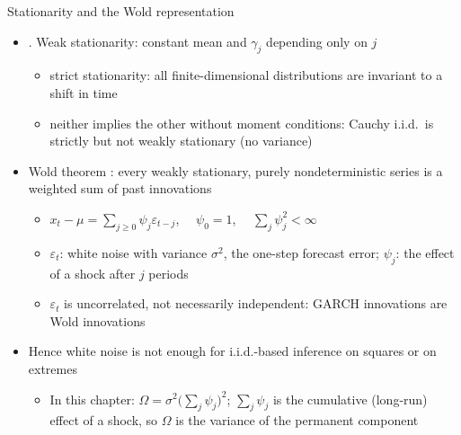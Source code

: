 \begin{frame}{Stationarity and the Wold representation}
\itemsize{\small}
\begin{itemize}
    \item {}. Weak stationarity: constant mean and $\gamma_j$ depending only on $j$
    \begin{itemize}
        \item strict stationarity: all finite-dimensional distributions are invariant to a shift in time
        \item neither implies the other without moment conditions: Cauchy i.i.d.\ is strictly but not weakly stationary (no variance)
    \end{itemize}
    \item Wold theorem : every weakly stationary, purely nondeterministic series is a weighted sum of past innovations
    \begin{itemize}
        \item $x_t - \mu = \sum_{j\ge 0}\psi_j\varepsilon_{t-j}$, $\quad \psi_0 = 1$, $\quad \sum_j\psi_j^2 < \infty$
        \item $\varepsilon_t$: white noise with variance $\sigma^2$, the one-step forecast error; $\psi_j$: the effect of a shock after $j$ periods
        \item $\varepsilon_t$ is uncorrelated, not necessarily independent: GARCH innovations are Wold innovations
    \end{itemize}
    \item Hence white noise is not enough for i.i.d.-based inference on squares or on extremes
    \begin{itemize}
        \item In this chapter: $\Omega = \sigma^2 \big(\sum_j \psi_j\big)^2$; $\sum_j\psi_j$ is the cumulative (long-run) effect of a shock, so $\Omega$ is the variance of the permanent component
    \end{itemize}
\end{itemize}
\end{frame}


